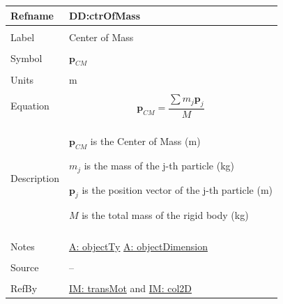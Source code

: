 \documentclass[12pt]{article}
\begin{document}
\noindent \begin{minipage}{\textwidth}
\begin{tabular}{p{} p{}}
\toprule \textbf{Refname} & \textbf{DD:ctrOfMass}
\label{DD:ctrOfMass}
\\ \midrule \\
Label & Center of Mass
\\ \midrule \\
Symbol & ${\mathbf{p}_{CM}}$
\\ \midrule \\
Units & m
\\ \midrule \\
Equation & \begin{displaymath}
           {\mathbf{p}_{CM}}=\frac{\displaystyle\sum{{m_{j}} {\mathbf{p}_{j}}}}{M}
           \end{displaymath}
\\ \midrule \\
Description & \begin{symbDescription}
              \item{${\mathbf{p}_{CM}}$ is the Center of Mass (m)}
              \item{${m_{j}}$ is the mass of the j-th particle (kg)}
              \item{${\mathbf{p}_{j}}$ is the position vector of the j-th particle (m)}
              \item{$M$ is the total mass of the rigid body (kg)}
              \end{symbDescription}
\\ \midrule \\
Notes & \hyperref[assumpOT]{A: objectTy}
        \hyperref[assumpOD]{A: objectDimension}
\\ \midrule \\
Source & --
\\ \midrule \\
RefBy & \hyperref[IM:transMot]{IM: transMot} and \hyperref[IM:col2D]{IM: col2D}
\\ \bottomrule \end{tabular}
\end{minipage}
\par~
\end{document}
